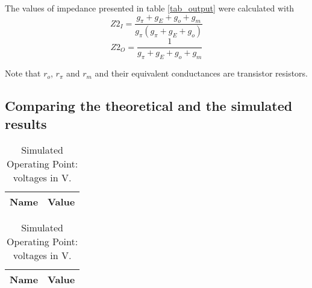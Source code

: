 The values of impedance presented in table \ref{tab_output} were calculated with
\begin{equation}
    Z2_I=\frac{g_{\pi}+g_{E}+g_{o}+g_{m}}{g_{\pi}(g_{\pi}+g_{E}+g_{o})}
\end{equation}
\begin{equation}
    Z2_O=\frac{1}{g_{\pi}+g_{E}+g_{o}+g_{m}}
\end{equation}

Note that $r_o$, $r_\pi$ and $r_m$ and their equivalent conductances are transistor resistors.

\subsection{Comparing the theoretical and the simulated results}

\begin{table}[H]
\parbox{.5\linewidth}{
\centering                
\def\arraystretch{1}        %

\begin{tabular}{c|c}        %
\hline                      %

\textbf{Name}  & \textbf{Value}\\     
\hline                      %

\hline                      %
\end{tabular}
\captionsetup{justification=justified, margin=0.5cm} 
\caption{Theoretical Operating Point: voltages in V.}
\label{tab7}
}
\hfill
\parbox{.5\linewidth}{
\centering
\def\arraystretch{1}

\begin{tabular}{c|c}
\hline    
\textbf{Name} & \textbf{Value} \\ \hline

\hline
\end{tabular}
\captionsetup{justification=justified, margin=0.5cm} 
\caption{Simulated Operating Point: voltages in V.}
\label{tab8}
}
\end{table}

